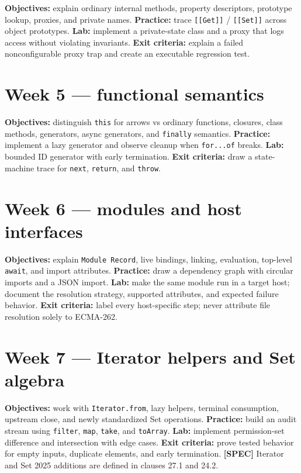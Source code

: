 \documentclass[11pt,letterpaper]{article}
\newcommand{\passthrough}[1]{#1}
\begin{document}
\textbf{Objectives:} explain ordinary internal methods, property descriptors, prototype lookup, proxies, and private names. \textbf{Practice:} trace \passthrough{\lstinline![[Get]]!} / \passthrough{\lstinline![[Set]]!} across object prototypes. \textbf{Lab:} implement a private-state class and a proxy that logs access without violating invariants. \textbf{Exit criteria:} explain a failed nonconfigurable proxy trap and create an executable regression test.

\section{Week 5 --- functional semantics}\label{week-5-functional-semantics}

\textbf{Objectives:} distinguish \passthrough{\lstinline!this!} for arrows vs ordinary functions, closures, class methods, generators, async generators, and \passthrough{\lstinline!finally!} semantics. \textbf{Practice:} implement a lazy generator and observe cleanup when \passthrough{\lstinline!for...of!} breaks. \textbf{Lab:} bounded ID generator with early termination. \textbf{Exit criteria:} draw a state-machine trace for \passthrough{\lstinline!next!}, \passthrough{\lstinline!return!}, and \passthrough{\lstinline!throw!}.

\section{Week 6 --- modules and host interfaces}\label{week-6-modules-and-host-interfaces}

\textbf{Objectives:} explain \passthrough{\lstinline!Module Record!}, live bindings, linking, evaluation, top-level \passthrough{\lstinline!await!}, and import attributes. \textbf{Practice:} draw a dependency graph with circular imports and a JSON import. \textbf{Lab:} make the same module run in a target host; document the resolution strategy, supported attributes, and expected failure behavior. \textbf{Exit criteria:} label every host-specific step; never attribute file resolution solely to ECMA-262.

\section{Week 7 --- Iterator helpers and Set algebra}\label{week-7-iterator-helpers-and-set-algebra}

\textbf{Objectives:} work with \passthrough{\lstinline!Iterator.from!}, lazy helpers, terminal consumption, upstream close, and newly standardized Set operations. \textbf{Practice:} build an audit stream using \passthrough{\lstinline!filter!}, \passthrough{\lstinline!map!}, \passthrough{\lstinline!take!}, and \passthrough{\lstinline!toArray!}. \textbf{Lab:} implement permission-set difference and intersection with edge cases. \textbf{Exit criteria:} prove tested behavior for empty inputs, duplicate elements, and early termination. \textbf{{[}SPEC{]}} Iterator and Set 2025 additions are defined in clauses 27.1 and 24.2.
\end{document}
